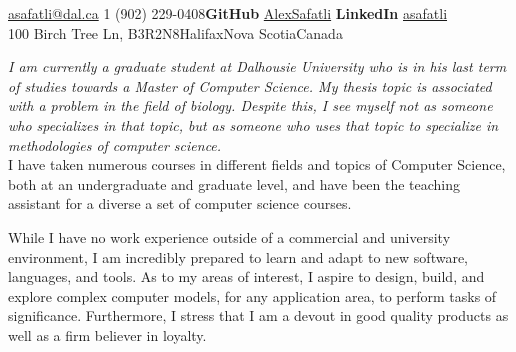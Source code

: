 \documentclass[10pt,a4paper]{article}
\begin{document}
 


\noindent\href{mailto:asafatli@dal.ca}{asafatli@dal.ca}\bull
\textsmaller{+}1 (902) 229-0408\bull \textbf{GitHub} \href{https://github.com/AlexSafatli/}{AlexSafatli}\bull
\textbf{LinkedIn} \href{http://ca.linkedin.com/in/asafatli}{asafatli}\\
100 Birch Tree Ln, B3R2N8\bull Halifax\bull Nova Scotia\bull Canada

\spacedhrule{0.9em}{-0.4em} %


\vspace{-1.3em}

\begin{multicols}{2}

\noindent \textit{I am currently a graduate student at Dalhousie University who is in his last term of studies towards a Master of Computer Science. My thesis topic is associated with a problem in the field of biology. Despite this, I see myself not as someone who specializes in that topic, but as someone who uses that topic to specialize in methodologies of computer science.}\\

I have taken numerous courses in different fields and topics of Computer Science, both at an undergraduate and graduate level, and have been the teaching assistant for a diverse a set of computer science courses. 

While I have no work experience outside of a commercial and university environment, I am incredibly prepared to learn and adapt to new software, languages, and tools. As to my areas of interest, I aspire to design, build, and explore complex computer models, for any application area, to perform tasks of significance. Furthermore, I stress that I am a devout in good quality products as well as a firm believer in loyalty.

\end{multicols}

\spacedhrule{0.5em}{-0.4em} %

\end{document}
